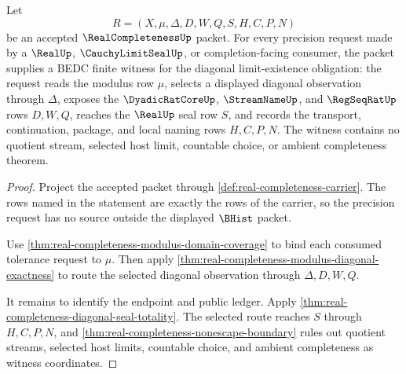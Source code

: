 \begin{theorem}
\label{thm:real-completeness-limit-existence-finite-witness}
Let
$$
R=(X,\mu,\Delta,D,W,Q,S,H,C,P,N)
$$
be an accepted $\RealCompletenessUp$ packet. For every precision request made by a $\RealUp$, $\CauchyLimitSealUp$, or completion-facing consumer, the packet supplies a BEDC finite witness for the diagonal limit-existence obligation: the request reads the modulus row $\mu$, selects a displayed diagonal observation through $\Delta$, exposes the $\DyadicRatCoreUp$, $\StreamNameUp$, and $\RegSeqRatUp$ rows $D,W,Q$, reaches the $\RealUp$ seal row $S$, and records the transport, continuation, package, and local naming rows $H,C,P,N$. The witness contains no quotient stream, selected host limit, countable choice, or ambient completeness theorem.
\end{theorem}
\begin{proof}
Project the accepted packet through \autoref{def:real-completeness-carrier}. The rows named in the statement are exactly the rows of the carrier, so the precision request has no source outside the displayed $\BHist$ packet.

Use \autoref{thm:real-completeness-modulus-domain-coverage} to bind each consumed tolerance request to $\mu$. Then apply \autoref{thm:real-completeness-modulus-diagonal-exactness} to route the selected diagonal observation through $\Delta,D,W,Q$.

It remains to identify the endpoint and public ledger. Apply \autoref{thm:real-completeness-diagonal-seal-totality}. The selected route reaches $S$ through $H,C,P,N$, and \autoref{thm:real-completeness-nonescape-boundary} rules out quotient streams, selected host limits, countable choice, and ambient completeness as witness coordinates.
\end{proof}

